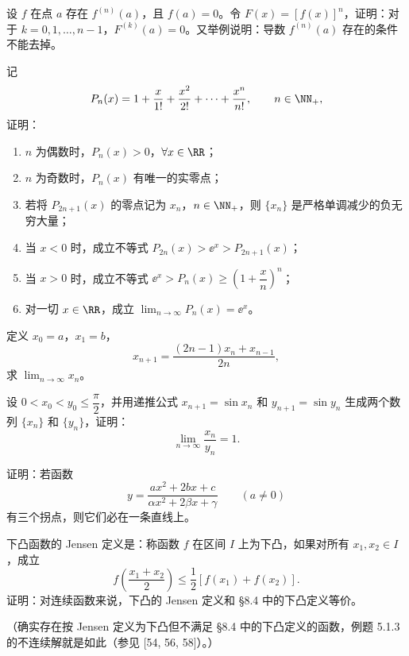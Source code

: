 \begin{xreferenceproblem}[3]
设 $f$ 在点 $a$ 存在 $f^{(n)}(a)$，且 $f(a)=0$。令 $F(x)=[f(x)]^n$，证明：对于 $k=0,1,\ldots,n-1$，$F^{(k)}(a)=0$。又举例说明：导数 $f^{(n)}(a)$ 存在的条件不能去掉。
\end{xreferenceproblem}

\begin{xreferenceproblem}[4]
记
  \[
    P_n(x)=1+\frac{x}{1!}+\frac{x^2}{2!}+\cdots+\frac{x^n}{n!},\qquad n\in\NN_+,
  \]
  证明：
  \begin{enumerate}[label=(\arabic*)]
    \item $n$ 为偶数时，$P_n(x)>0$，$\forall x\in\RR$；
    \item $n$ 为奇数时，$P_n(x)$ 有唯一的实零点；
    \item 若将 $P_{2n+1}(x)$ 的零点记为 $x_n$，$n\in\NN_+$，则 $\{x_n\}$ 是严格单调减少的负无穷大量；
    \item 当 $x<0$ 时，成立不等式 $P_{2n}(x)>\ee^x>P_{2n+1}(x)$；
    \item 当 $x>0$ 时，成立不等式 $\ee^x>P_n(x)\ge\left(1+\dfrac xn\right)^n$；
    \item 对一切 $x\in\RR$，成立 $\displaystyle\lim_{n\to\infty}P_n(x)=\ee^x$。
  \end{enumerate}
\end{xreferenceproblem}

\begin{xreferenceproblem}[5]
定义 $x_0=a$，$x_1=b$，
  \[
    x_{n+1}=\frac{(2n-1)x_n+x_{n-1}}{2n},
  \]
  求 $\displaystyle\lim_{n\to\infty}x_n$。
\end{xreferenceproblem}

\begin{xreferenceproblem}[6]
设 $0<x_0<y_0\le\dfrac\pi2$，并用递推公式 $x_{n+1}=\sin x_n$ 和 $y_{n+1}=\sin y_n$ 生成两个数列 $\{x_n\}$ 和 $\{y_n\}$，证明：
  \[
    \lim_{n\to\infty}\frac{x_n}{y_n}=1.
  \]
\end{xreferenceproblem}

\begin{xreferenceproblem}[7]
证明：若函数
  \[
    y=\frac{ax^2+2bx+c}{\alpha x^2+2\beta x+\gamma}\qquad(a\ne0)
  \]
  有三个拐点，则它们必在一条直线上。
\end{xreferenceproblem}

\begin{xreferenceproblem}[8]
下凸函数的 Jensen 定义是：称函数 $f$ 在区间 $I$ 上为下凸，如果对所有 $x_1,x_2\in I$，成立
  \[
    f\left(\frac{x_1+x_2}{2}\right)\le\frac12[f(x_1)+f(x_2)].
  \]
  证明：对连续函数来说，下凸的 Jensen 定义和 §8.4 中的下凸定义等价。

  （确实存在按 Jensen 定义为下凸但不满足 §8.4 中的下凸定义的函数，例题 5.1.3 的不连续解就是如此（参见 [54, 56, 58]）。）
\end{xreferenceproblem}


